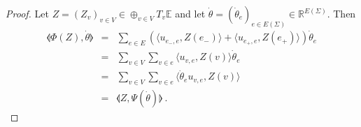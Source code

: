 \documentclass[notitlepage,twoside,a4paper]{amsart}
\theoremstyle{named}
\newcommand{\R}{{\mathbb R}}
\newcommand{\bE}{{\mathbb E}}
\begin{document}
\begin{proof}
  Let $Z=(Z_v)_{v\in V}\in \oplus_{v\in V}T_v\bE$ and let $\dot\theta=(\dot \theta_e)_{e\in E(\Sigma)}\in \R^{E(\Sigma)}$. Then
  \begin{eqnarray*}
    \llangle \Phi(Z), \dot \theta\rrangle
    & = & \sum_{e\in E} (\langle u_{e_-,e}, Z(e_-)\rangle+\langle u_{e_+,e}, Z(e_+)\rangle)\dot \theta_e \\
    & = & \sum_{v\in V}\sum_{v\in e} \langle u_{v,e}, Z(v)\rangle \dot \theta_e \\
    & = & \sum_{v\in V}\sum_{v\in e} \langle  \dot \theta_e u_{v,e}, Z(v)\rangle \\
    & = & \llangle Z, \Psi(\dot \theta)\rrangle~.                                                
  \end{eqnarray*}
\end{proof}
\end{document}
